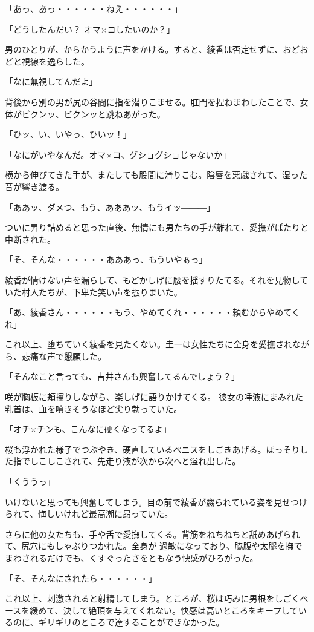 ﻿\documentclass[book,tate]{jlreq}
\begin{document}
「あっ、あっ・・・・・・ねえ・・・・・・」

「どうしたんだい？ オマ×コしたいのか？」

男のひとりが、からかうように声をかける。すると、綾香は否定せずに、おどおどと視線を逸らした。

「なに無視してんだよ」

背後から別の男が尻の谷間に指を潜りこませる。肛門を捏ねまわしたことで、女体がビクンッ、ビクンッと跳ねあがった。

「ひッ、い、いやっ、ひいッ！」

「なにがいやなんだ。オマ×コ、グショグショじゃないか」

横から伸びてきた手が、またしても股間に滑りこむ。陰唇を悪戯されて、湿った音が響き渡る。

「ああッ、ダメつ、もう、あああッ、もうイッ―――」

ついに昇り詰めると思った直後、無情にも男たちの手が離れて、愛撫がぱたりと中断された。

「そ、そんな・・・・・・あああっ、もういやぁっ」

綾香が情けない声を漏らして、もどかしげに腰を揺すりたてる。それを見物していた村人たちが、下卑た笑い声を振りまいた。

「あ、綾香さん・・・・・・もう、やめてくれ・・・・・・頼むからやめてくれ」

これ以上、堕ちていく綾香を見たくない。圭一は女性たちに全身を愛撫されながら、悲痛な声で懇願した。

「そんなこと言っても、吉井さんも興奮してるんでしょう？」

咲が胸板に頬擦りしながら、楽しげに語りかけてくる。 彼女の唾液にまみれた乳首は、血を噴きそうなほど尖り勃っていた。

「オチ×チンも、こんなに硬くなってるよ」

桜も浮かれた様子でつぶやき、硬直しているペニスをしごきあげる。ほっそりした指でしこしこされて、先走り液が次から次へと溢れ出した。

「くううっ」

いけないと思っても興奮してしまう。目の前で綾香が嬲られている姿を見せつけられて、悔しいけれど最高潮に昂っていた。

さらに他の女たちも、手や舌で愛撫してくる。背筋をねちねちと舐めあげられて、尻穴にもしゃぶりつかれた。全身が 過敏になっており、脇腹や太腿を撫でまわされるだけでも、くすぐったさをともなう快感がひろがった。

「そ、そんなにされたら・・・・・・」

これ以上、刺激されると射精してしまう。ところが、桜は巧みに男根をしごくペースを緩めて、決して絶頂を与えてくれない。快感は高いところをキープしているのに、ギリギリのところで達することができなかった。
\end{document}
